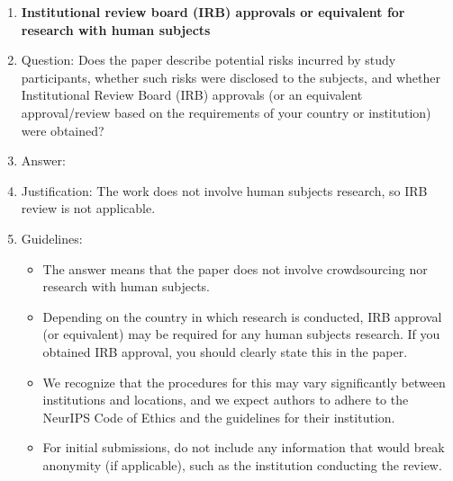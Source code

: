 \begin{enumerate}
\item {\bf Institutional review board (IRB) approvals or equivalent for research with human subjects}
    \item[] Question: Does the paper describe potential risks incurred by study participants, whether such risks were disclosed to the subjects, and whether Institutional Review Board (IRB) approvals (or an equivalent approval/review based on the requirements of your country or institution) were obtained?
    \item[] Answer: \answerNA{}
    \item[] Justification: The work does not involve human subjects research, so IRB review is not applicable.
    \item[] Guidelines:
    \begin{itemize}
        \item The answer \answerNA{} means that the paper does not involve crowdsourcing nor research with human subjects.
        \item Depending on the country in which research is conducted, IRB approval (or equivalent) may be required for any human subjects research. If you obtained IRB approval, you should clearly state this in the paper.
        \item We recognize that the procedures for this may vary significantly between institutions and locations, and we expect authors to adhere to the NeurIPS Code of Ethics and the guidelines for their institution.
        \item For initial submissions, do not include any information that would break anonymity (if applicable), such as the institution conducting the review.
    \end{itemize}


\end{enumerate}
